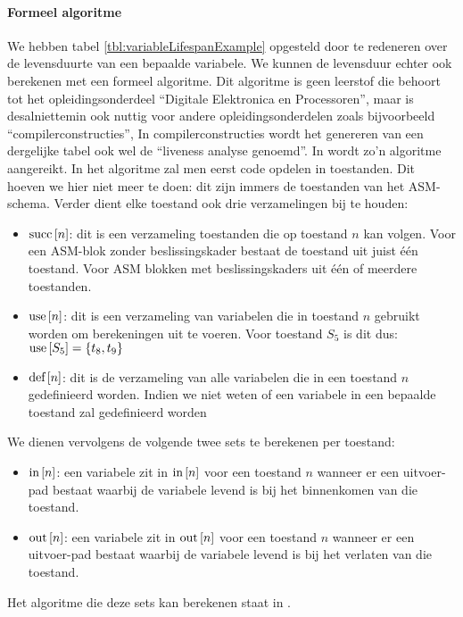 \paragraph{Formeel algoritme}We hebben tabel \ref{tbl:variableLifespanExample} opgesteld door te redeneren over de levensduurte van een bepaalde variabele. We kunnen de levensduur echter ook berekenen met een formeel algoritme. Dit algoritme is geen leerstof die behoort tot het opleidingsonderdeel ``Digitale Elektronica en Processoren'', maar is desalniettemin ook nuttig voor andere opleidingsonderdelen zoals bijvoorbeeld ``compilerconstructies'', In compilerconstructies wordt het genereren van een dergelijke tabel ook wel de ``liveness analyse genoemd''. In \cite{books/cu/Appel2002} wordt zo'n algoritme aangereikt. In het algoritme zal men eerst code opdelen in toestanden. Dit hoeven we hier niet meer te doen: dit zijn immers de toestanden van het ASM-schema. Verder dient elke toestand ook drie verzamelingen bij te houden:
\begin{itemize}
 \item $\mbox{succ}\left[n\right]$: dit is een verzameling toestanden die op toestand $n$ kan volgen. Voor een ASM-blok zonder beslissingskader bestaat de toestand uit juist \'e\'en toestand. Voor ASM blokken met beslissingskaders uit \'e\'en of meerdere toestanden.
 \item $\mbox{use}\left[n\right]$: dit is een verzameling van variabelen die in toestand $n$ gebruikt worden om berekeningen uit te voeren. Voor toestand $S_5$ is dit dus: $\mbox{use}\left[S_5\right]=\left\{t_8,t_9\right\}$
 \item $\mbox{def}\left[n\right]$: dit is de verzameling van alle variabelen die in een toestand $n$ gedefinieerd worden. Indien we niet weten of een variabele in een bepaalde toestand zal gedefinieerd worden
\end{itemize}
We dienen vervolgens de volgende twee sets te berekenen per toestand:
\begin{itemize}
 \item $\mbox{in}\left[n\right]$: een variabele zit in $\mbox{in}\left[n\right]$ voor een toestand $n$ wanneer er een uitvoer-pad bestaat waarbij de variabele levend is bij het binnenkomen van die toestand.
 \item $\mbox{out}\left[n\right]$: een variabele zit in $\mbox{out}\left[n\right]$ voor een toestand $n$ wanneer er een uitvoer-pad bestaat waarbij de variabele levend is bij het verlaten van die toestand.
\end{itemize}
Het algoritme die deze sets kan berekenen staat in .
